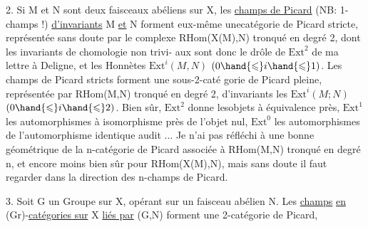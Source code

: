 2. Si M et N sont deux faisceaux abéliens sur X, les \uline{champs de Picard}
(NB: 1-champs !) \uline{d'invariants} M \uline{et} N forment eux-même unecatégorie de
\margin{$\times$} Picard stricte, représentée  sans doute par le complexe RHom(X(M),N) 
tronqué en  degré 2, dont les invariants de chomologie non trivi-%
aux sont donc le drôle de $\mathrm{Ext}^2$ de ma lettre à Deligne, et les Honnètes
$\mathrm{Ext}^i(M,N)$  $(0 \hand{\leqslant} i \hand{\leqslant} 1)$. Les champs de Picard stricts forment une sous-2-caté%
gorie de Picard pleine, représentée par RHom(M,N) tronqué en degré 2,
d'invariants les $\mathrm{Ext}^i(M;N)$ $(0 \hand{\leqslant} i \hand{\leqslant} 2)$. Bien sûr, $\mathrm{Ext}^2$ donne lesobjets à
équivalence près, $\mathrm{Ext}^1$ les automorphismes à isomorphisme près de l'objet
nul, $\mathrm{Ext}^0$ les automorphismes de l'automorphisme identique audit ... Je n'ai
pas réfléchi à une bonne  géométrique de la n-catégorie de
Picard associée à RHom(M,N) tronqué en degré n, et encore moins bien sûr
pour RHom(X(M),N), mais sans doute il faut regarder dans la direction des
n-champs de Picard.

3. Soit G un Groupe sur X, opérant sur un faisceau abélien N. Les \uline{champs}
\uline{en} (Gr)-\uline{catégories sur} X \uline{liés par} (G,N) forment une 2-catégorie de Picard,

